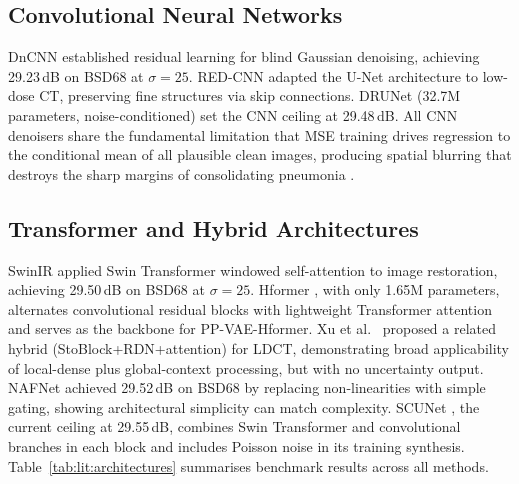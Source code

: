 \documentclass[12pt, a4paper, twoside, openright]{book}
\begin{document}
\subsection{Convolutional Neural Networks}
\label{sec:lit:architectures:cnn}

DnCNN \cite{zhang_beyond_2017} established residual learning for blind Gaussian denoising, achieving 29.23\,dB on BSD68 at $\sigma=25$. RED-CNN \cite{chen_low-dose_2017} adapted the U-Net architecture to low-dose CT, preserving fine structures via skip connections. DRUNet \cite{zhang_drunet_2021} (32.7M parameters, noise-conditioned) set the CNN ceiling at 29.48\,dB. All CNN denoisers share the fundamental limitation that MSE training drives regression to the conditional mean of all plausible clean images, producing spatial blurring that destroys the sharp margins of consolidating pneumonia \cite{zhao_loss_2017}.

\subsection{Transformer and Hybrid Architectures}
\label{sec:lit:architectures:transformer}

SwinIR \cite{liang_swinir_2021} applied Swin Transformer windowed self-attention to image restoration, achieving 29.50\,dB on BSD68 at $\sigma=25$. Hformer \cite{zhang_hformer_2023}, with only 1.65M parameters, alternates convolutional residual blocks with lightweight Transformer attention and serves as the backbone for PP-VAE-Hformer. Xu et al.\ \cite{xuLowdoseComputedTomography2025} proposed a related hybrid (StoBlock+RDN+attention) for LDCT, demonstrating broad applicability of local-dense plus global-context processing, but with no uncertainty output. NAFNet \cite{chen_nafnet_2022} achieved 29.52\,dB on BSD68 by replacing non-linearities with simple gating, showing architectural simplicity can match complexity. SCUNet \cite{zhang_scunet_2023}, the current ceiling at 29.55\,dB, combines Swin Transformer and convolutional branches in each block and includes Poisson noise in its training synthesis. Table~\ref{tab:lit:architectures} summarises benchmark results across all methods.
\end{document}
